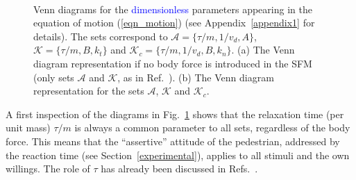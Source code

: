 \documentclass[preprint,12pt]{elsarticle}
\begin{document}
\begin{figure}[!htbp]
\centering
 
\hfill    
{}\\
\caption[width=0.47\columnwidth]{Venn diagrams for the \textcolor{blue}{dimensionless} parameters
appearing in the equation of motion (\ref{eqn_motion}) (see 
Appendix~\ref{appendix1} for details). The sets correspond to 
$\mathcal{A}=\{\tau/m,1/v_d,A\}$, $\mathcal{K}=\{\tau/m,B,k_t\}$ and 
$\mathcal{K}_c=\{\tau/m,1/v_d,B,k_n\}$. (a) The Venn diagram representation if no 
body force is introduced in the SFM (only sets $\mathcal{A}$ and $\mathcal{K}$, 
as in Ref.~\cite{dorso_2019}). (b) The Venn diagram representation for the sets 
$\mathcal{A}$, $\mathcal{K}$ and $\mathcal{K}_c$. }
\label{venn_diagram}
\end{figure}

A first inspection of the diagrams in Fig.~\ref{venn_diagram} shows that the 
relaxation time (per unit mass) $\tau/m$ is always a common parameter to all 
sets, regardless of the body force. This means that the ``assertive'' attitude 
of the pedestrian, addressed by the reaction time (see 
Section~\ref{experimental}), applies to all stimuli and the own willings. The 
role of $\tau$ has already been discussed in 
Refs.~\cite{johansson_2009,dorso_2019}.    \\ 
\end{document}

